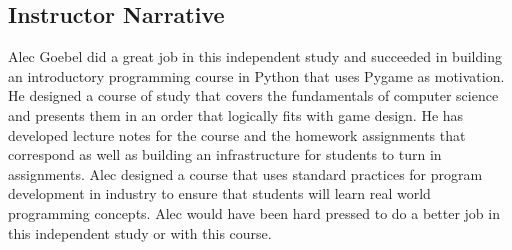 
\subsection*{Instructor Narrative}
Alec Goebel did a great job in this independent study and succeeded
in building an introductory programming course in Python that uses
Pygame as motivation. He designed a course of study that covers the
fundamentals of computer science and presents them in an order that
logically fits with game design. He has developed lecture notes for the
course and the homework assignments that correspond as well as building
an infrastructure for students to turn in assignments. Alec designed a
course that uses standard practices for program development in industry
to ensure that students will learn real world programming concepts. Alec
would have been hard pressed to do a better job in this independent
study or with this course.
